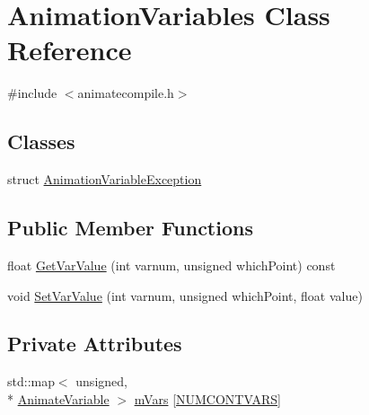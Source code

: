 \hypertarget{a00014}{\section{Animation\-Variables Class Reference}
\label{a00014}
}


{\ttfamily \#include $<$animatecompile.\-h$>$}

\subsection*{Classes}
\begin{DoxyCompactItemize}
\item 
struct \hyperlink{a00013}{Animation\-Variable\-Exception}
\end{DoxyCompactItemize}
\subsection*{Public Member Functions}
\begin{DoxyCompactItemize}
\item 
float \hyperlink{a00014_ab3a56d24e0aa875997a0c7d149bf9e73}{Get\-Var\-Value} (int varnum, unsigned which\-Point) const 
\item 
void \hyperlink{a00014_a822d1f5ec873c01fc9ca2aaa7d191f15}{Set\-Var\-Value} (int varnum, unsigned which\-Point, float value)
\end{DoxyCompactItemize}
\subsection*{Private Attributes}
\begin{DoxyCompactItemize}
\item 
std\-::map$<$ unsigned, \\*
\hyperlink{a00009}{Animate\-Variable} $>$ \hyperlink{a00014_ae2e78834cf9f855f42314957cfb3af9c}{m\-Vars} \mbox{[}\hyperlink{a00196_adc29c2ff13d900c2f185ee95427fb06cad07b65e5832fc82b05c01e24494aa5ad}{N\-U\-M\-C\-O\-N\-T\-V\-A\-R\-S}\mbox{]}
\end{DoxyCompactItemize}



